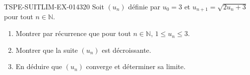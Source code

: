 \begin{exercice}{TSPE-SUITLIM-EX-014}{3}{20}
Soit $(u_n)$ définie par $u_0 = 3$ et $u_{n+1} = \sqrt{2u_n + 3}$ pour tout $n \in \mathbb{N}$.
\begin{enumerate}
  \item Montrer par récurrence que pour tout $n \in \mathbb{N}$, $1 \leq u_n \leq 3$.
  \item Montrer que la suite $(u_n)$ est décroissante.
  \item En déduire que $(u_n)$ converge et déterminer sa limite.
\end{enumerate}
\end{exercice}
